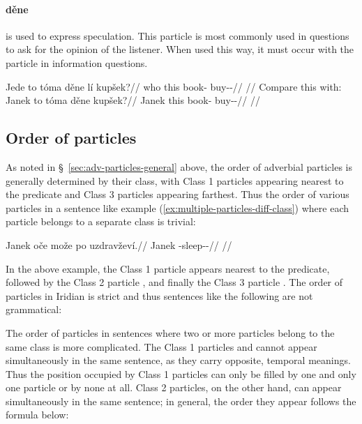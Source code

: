 \paragraph{děne}  is used to express speculation. This particle is
most commonly used in questions to ask for the opinion of the listener. When
used this way, it must occur with the particle  in information
questions.

\pex
\a
\begingl
	\gla Jede to tóma děne lí kupšek?//
	\glb who this book-\Acc{} \Spec{} \Q{} buy-\Av{}-\Pf{}//
	\glft {}//
\endgl
\a Compare this with:\\
\begingl
	\gla Janek to tóma děne kupšek?//
	\glb Janek this book-\Acc{} \Spec{} buy-\Av{}-\Pf{}//
	\glft {}//
\endgl
\xe

\subsection{Order of particles}\label{sec:order-of-particles}

As noted in \S~\ref{sec:adv-particles-general} above, the order of adverbial
particles is generally determined by their class, with Class 1 particles
appearing nearest to the predicate and Class 3 particles appearing farthest.
Thus the order of various particles in a sentence like example
(\ref{ex:multiple-particles-diff-class}) where each particle belongs to a
separate class is trivial:

\pex\label{ex:multiple-particles-diff-class}
\begingl
	\gla Janek oče može po uzdravževí.//
	\glb Janek \Mir{} \Add{} \Ipfv{} \Refl{}-sleep-\Av{}-\Cont{}//
	\glft {}//
\endgl
\xe

In the above example, the Class 1 particle  appears nearest to the
predicate, followed by the Class 2 particle , and finally the Class 3
particle . The order of particles in Iridian is strict and thus
sentences like the following are not grammatical:

\pex
\a \ljudge{*} 
\a \ljudge{*} 
\a \ljudge{*} 
\a \ljudge{*} 
\a \ljudge{*} 
\xe

The order of particles in sentences where two or more particles belong to the
same class is more complicated. The Class 1 particles  and 
cannot appear simultaneously in the same sentence, as they carry opposite,
temporal meanings. Thus the position occupied by Class 1 particles can only be
filled by one and only one particle or by none at all. Class 2 particles, on the
other hand, can appear simultaneously in the same sentence; in general, the
order they appear follows the formula below:

